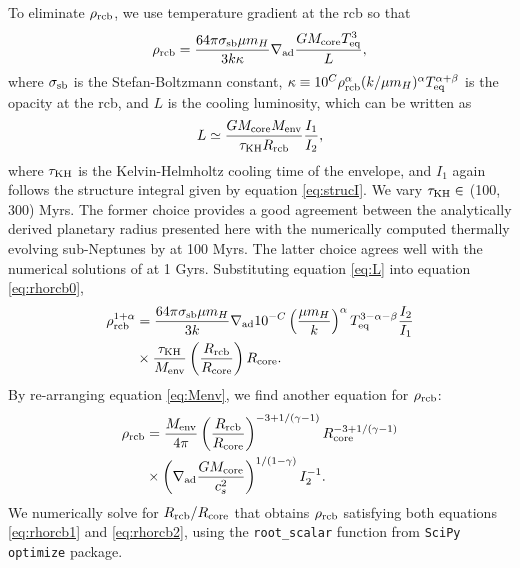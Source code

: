 \documentclass[twocolumn]{aastex63}
\begin{document}
To eliminate $\rho_{\rm rcb}$, we use temperature gradient at the rcb so that
%
\begin{equation}
    \label{eq:rhorcb0}
    \rho_{\rm rcb} = \frac{64\pi\sigma_{\rm sb}\mu m_H}{3k\kappa}\nabla_{\rm ad}\frac{GM_{\rm core}T_{\rm eq}^3}{L},
\end{equation}
%
where $\sigma_{\rm sb}$ is the Stefan-Boltzmann constant, $\kappa \equiv 10^C \rho_{\rm rcb}^\alpha (k/\mu m_H)^\alpha T_{\rm eq}^{\alpha+\beta}$ is the opacity at the rcb, and $L$ is the cooling luminosity, which can be written as
%
\begin{equation}
    \label{eq:L}
    L \simeq \frac{GM_{\rm core}M_{\rm env}}{\tau_{\rm KH}R_{\rm rcb}}\frac{I_1}{I_2},
\end{equation}
%
where $\tau_{\rm KH}$ is the Kelvin-Helmholtz cooling time of the envelope, and $I_1$ again follows the structure integral given by equation \ref{eq:strucI}. We vary $\tau_{\rm KH} \in$ (100, 300) Myrs. The former choice provides a good agreement between the analytically derived planetary radius presented here with the numerically computed thermally evolving sub-Neptunes by \citet{Lopez14} at 100 Myrs. The latter choice agrees well with the numerical solutions of \citet{Lopez14} at 1 Gyrs.
Substituting equation \ref{eq:L} into equation \ref{eq:rhorcb0},
%
\begin{align}
    \label{eq:rhorcb1}
    \rho_{\rm rcb}^{1+\alpha} &= \frac{64\pi\sigma_{\rm sb}\mu m_H}{3k} \nabla_{\rm ad} 10^{-C} \left(\frac{\mu m_H}{k}\right)^{\alpha}T_{\rm eq}^{3-\alpha-\beta}\frac{I_2}{I_1} \nonumber \\
    &\times \frac{\tau_{\rm KH}}{M_{\rm env}}\left(\frac{R_{\rm rcb}}{R_{\rm core}}\right)R_{\rm core}.
\end{align}
%
By re-arranging equation \ref{eq:Menv}, we find another equation for $\rho_{\rm rcb}$:
\begin{align}
    \label{eq:rhorcb2}
    \rho_{\rm rcb} &= \frac{M_{\rm env}}{4\pi}\left(\frac{R_{\rm rcb}}{R_{\rm core}}\right)^{-3+1/(\gamma-1)}R_{\rm core}^{-3+1/(\gamma-1)} \nonumber \\ &\times \left(\nabla_{\rm ad}\frac{GM_{\rm core}}{c_s^2}\right)^{1/(1-\gamma)}I_2^{-1}.
\end{align}
We numerically solve for $R_{\rm rcb}/R_{\rm core}$ that obtains $\rho_{\rm rcb}$ satisfying both equations \ref{eq:rhorcb1} and \ref{eq:rhorcb2}, using the \texttt{root\_scalar} function from \texttt{SciPy optimize} package. 
\end{document}
